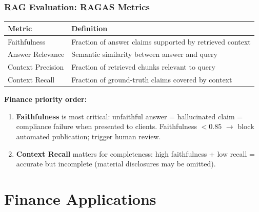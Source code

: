\documentclass[9pt,t]{beamer}
\begin{document}
\begin{frame}
\frametitle{RAG Evaluation: RAGAS Metrics}

\begin{center}
\begin{tabular}{lp{}}
\toprule
\textbf{Metric} & \textbf{Definition} \\
\midrule
Faithfulness & Fraction of answer claims supported by retrieved context \\
Answer Relevance & Semantic similarity between answer and query \\
Context Precision & Fraction of retrieved chunks relevant to query \\
Context Recall & Fraction of ground-truth claims covered by context \\
\bottomrule
\end{tabular}
\end{center}

\medskip
\textbf{Finance priority order:}
\begin{enumerate}
  \item \textbf{Faithfulness} is most critical: unfaithful answer = hallucinated claim
        = compliance failure when presented to clients.
        Faithfulness $< 0.85$ $\to$ block automated publication; trigger human review.
  \item \textbf{Context Recall} matters for completeness:
        high faithfulness + low recall = accurate but incomplete (material disclosures may be omitted).
\end{enumerate}
\end{frame}

\section{Finance Applications}
\end{document}
